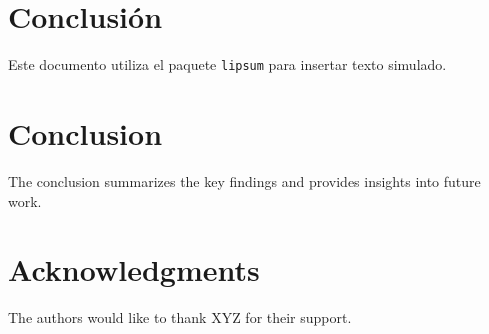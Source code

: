 \documentclass[conference]{IEEEtran}
\begin{document}
\section{Conclusión}
Este documento utiliza el paquete \texttt{lipsum} para insertar texto simulado.
\lipsum[6]
\section{Conclusion}
The conclusion summarizes the key findings and provides insights into future work.
\lipsum[1]
\lipsum[1]
\lipsum[1]
\lipsum[1]

\section*{Acknowledgments}
The authors would like to thank XYZ for their support.



\end{document}
